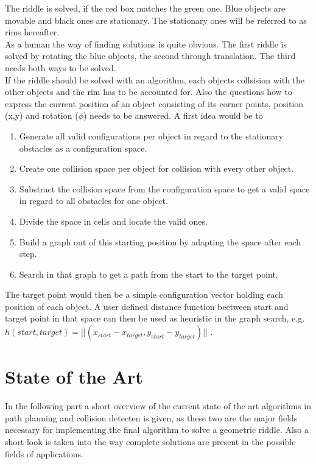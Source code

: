 The riddle is solved, if the red box matches the green one. Blue objects are movable and black ones are stationary. The stationary ones will be referred to as rims hereafter.\\
As a human the way of finding solutions is quite obvious. The first riddle is solved by rotating the blue objects, the second through translation. The third needs both ways to be solved.\\
If the riddle should be solved with an algorithm, each objects collsision with the other objects and the rim has to be accounted for. Also the questions how to express the current position of an object consisting of its corner points, position (x,y) and rotation ($\phi$) needs to be answered. A first idea would be to 
\begin{enumerate}
\item Generate all valid configurations per object in regard to the stationary obstacles as a configuration space.
\item Create one collision space per object for collision with every other object. 
\item Substract the collision space from the configuration space to get a valid space in regard to all obstacles for one object.
\item Divide the space in cells and locate the valid ones.
\item Build a graph out of this starting position by adapting the space after each step.
\item Search in that graph to get a path from the  start to the target point.
\end{enumerate}

The target point would then be a simple configuration vector holding each position of each object. A user defined distance function beetween start and target point in that space can then be used as heuristic in the graph search, e.g. $h(start,target) = || ( x_{start} -  x_{target} , y_{start} - y_{target} ) ||$ .


\section{State of the Art}
In the following part a short overview of the current state of the art algorithms in path planning and collision detecten is given, as these two are the major fields necessary for implementing the final algorithm to solve a geometric riddle. Also a short look is taken into the way complete solutions are present in the possible fields of applications.
